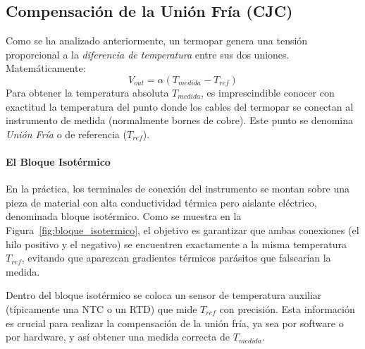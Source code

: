 


\subsection{Compensación de la Unión Fría (CJC)}\label{sec:cjc}

Como se ha analizado anteriormente, un termopar genera una tensión proporcional a la \emph{diferencia de temperatura} entre sus dos uniones. Matemáticamente:
\begin{equation}
    V_{out} = \alpha (T_{medida} - T_{ref})
\end{equation}
Para obtener la temperatura absoluta $T_{medida}$, es imprescindible conocer con exactitud la temperatura del punto donde los cables del termopar se conectan al instrumento de medida (normalmente bornes de cobre). Este punto se denomina \emph{Unión Fría} o de referencia ($T_{ref}$).

\paragraph{El Bloque Isotérmico}
En la práctica, los terminales de conexión del instrumento se montan sobre una pieza de material con alta conductividad térmica pero aislante eléctrico, denominada bloque isotérmico. Como se muestra en la Figura~\ref{fig:bloque_isotermico}, el objetivo es garantizar que ambas conexiones (el hilo positivo y el negativo) se encuentren exactamente a la misma temperatura $T_{ref}$, evitando que aparezcan gradientes térmicos parásitos que falsearían la medida.

Dentro del bloque isotérmico se coloca un sensor de temperatura auxiliar (típicamente una NTC o un RTD) que mide $T_{ref}$ con precisión. Esta información es crucial para realizar la compensación de la unión fría, ya sea por software o por hardware, y así obtener una medida correcta de $T_{medida}$.

